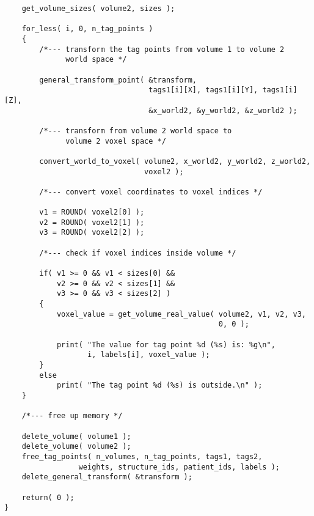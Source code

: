 {\begin{verbatim}
    get_volume_sizes( volume2, sizes );

    for_less( i, 0, n_tag_points )
    {
        /*--- transform the tag points from volume 1 to volume 2
              world space */

        general_transform_point( &transform,
                                 tags1[i][X], tags1[i][Y], tags1[i][Z],
                                 &x_world2, &y_world2, &z_world2 );

        /*--- transform from volume 2 world space to
              volume 2 voxel space */

        convert_world_to_voxel( volume2, x_world2, y_world2, z_world2,
                                voxel2 );

        /*--- convert voxel coordinates to voxel indices */

        v1 = ROUND( voxel2[0] );
        v2 = ROUND( voxel2[1] );
        v3 = ROUND( voxel2[2] );

        /*--- check if voxel indices inside volume */
     
        if( v1 >= 0 && v1 < sizes[0] &&
            v2 >= 0 && v2 < sizes[1] &&
            v3 >= 0 && v3 < sizes[2] )
        {
            voxel_value = get_volume_real_value( volume2, v1, v2, v3,
                                                 0, 0 );

            print( "The value for tag point %d (%s) is: %g\n",
                   i, labels[i], voxel_value );
        }
        else
            print( "The tag point %d (%s) is outside.\n" );
    }

    /*--- free up memory */

    delete_volume( volume1 );
    delete_volume( volume2 );
    free_tag_points( n_volumes, n_tag_points, tags1, tags2,
                 weights, structure_ids, patient_ids, labels );
    delete_general_transform( &transform );

    return( 0 );
}
\end{verbatim}
}


